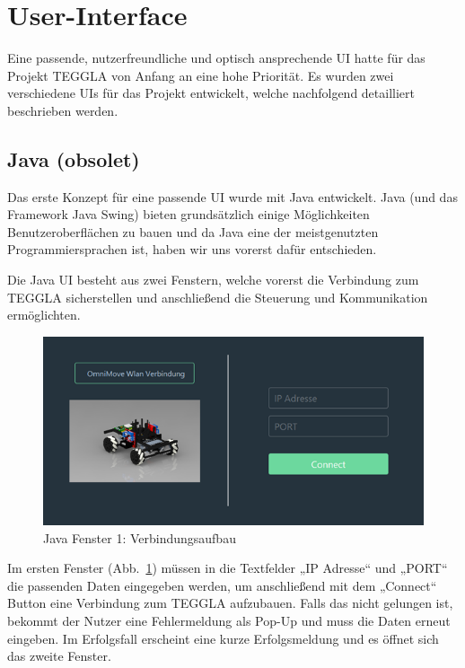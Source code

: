 \section{User-Interface}
Eine passende, nutzerfreundliche und optisch ansprechende UI hatte für das Projekt TEGGLA von Anfang an eine hohe Priorität. Es wurden zwei verschiedene UIs für das Projekt entwickelt, welche nachfolgend detailliert beschrieben werden. 

\subsection{Java (obsolet)}
Das erste Konzept für eine passende UI wurde mit Java entwickelt. 
Java (und das Framework Java Swing) bieten grundsätzlich einige Möglichkeiten Benutzeroberflächen zu bauen und da Java eine der meistgenutzten Programmiersprachen ist, haben wir uns vorerst dafür entschieden.

Die Java UI besteht aus zwei Fenstern, welche vorerst die Verbindung zum TEGGLA sicherstellen und anschließend die Steuerung und Kommunikation ermöglichten.

\begin{figure}[H]
	\centering
	\includegraphics[width=\textwidth]{bilder/java2.png}
	\caption{Java Fenster 1: Verbindungsaufbau}
	\label{bild:java1}
\end{figure}


Im ersten Fenster (Abb.~\ref{bild:java1}) müssen in die Textfelder „IP Adresse“ und „PORT“ die passenden Daten eingegeben werden, um anschließend mit dem „Connect“ Button eine Verbindung zum TEGGLA aufzubauen. 
Falls das nicht gelungen ist, bekommt der Nutzer eine Fehlermeldung als Pop-Up und muss die Daten erneut eingeben. 
Im Erfolgsfall erscheint eine kurze Erfolgsmeldung und es öffnet sich das zweite Fenster.\\

